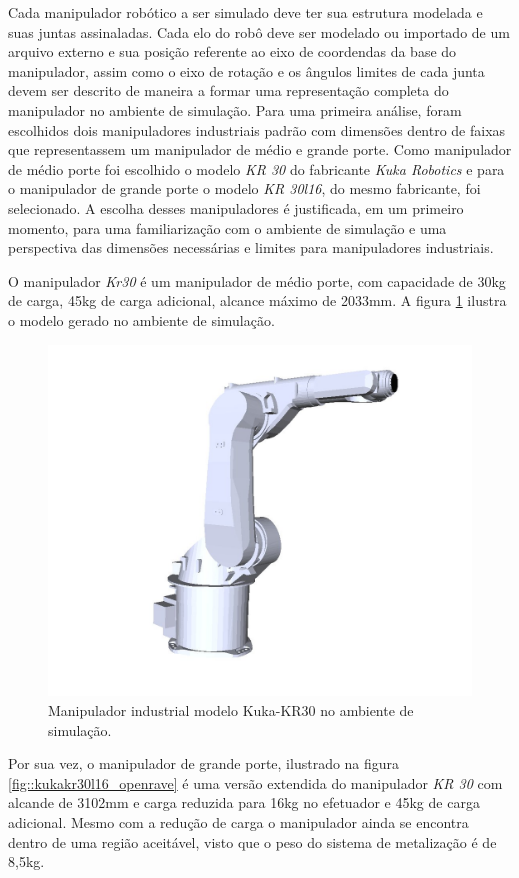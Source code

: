 Cada manipulador robótico a ser simulado deve ter sua estrutura modelada e suas
juntas assinaladas. Cada elo do robô deve ser modelado ou importado de um
arquivo externo e sua posição referente ao eixo de coordendas da base do
manipulador, assim como o eixo de rotação e os ângulos
limites de cada junta devem ser descrito de maneira a formar uma representação
completa do manipulador no ambiente de simulação. Para uma primeira análise,
foram escolhidos dois manipuladores industriais padrão com dimensões dentro de
faixas que representassem um manipulador de médio e grande porte. Como
manipulador de médio porte foi escolhido o modelo \textit{KR 30} do fabricante
\textit{Kuka Robotics} e para o manipulador de grande porte o modelo
\textit{KR 30l16}, do mesmo fabricante, foi selecionado.
A escolha desses manipuladores é justificada, em um primeiro momento, para uma
familiarização com o ambiente de simulação e uma perspectiva das dimensões
necessárias e limites para manipuladores industriais. 

O manipulador \textit{Kr30} é um manipulador de médio porte, com capacidade de
30kg de carga, 45kg de carga adicional, alcance máximo de 2033mm. A figura
\ref{fig::kukakr30_openrave} ilustra o modelo gerado no ambiente de simulação. 

\begin{figure}[h!]
\centering
	\includegraphics[width=0.8\columnwidth]{figs/openrave/kukakr30_openrave}
	\caption{Manipulador industrial modelo Kuka-KR30 no ambiente de simulação.}
	\label{fig::kukakr30_openrave}
\end{figure}

Por sua vez, o manipulador de grande porte, ilustrado na figura
\ref{fig::kukakr30l16_openrave} é uma versão extendida do manipulador \textit{KR
30} com alcande de 3102mm e carga reduzida para 16kg no efetuador e 45kg de carga adicional. Mesmo com a redução de carga o manipulador ainda se
encontra dentro de uma região aceitável, visto que o peso do sistema de
metalização é de 8,5kg.

